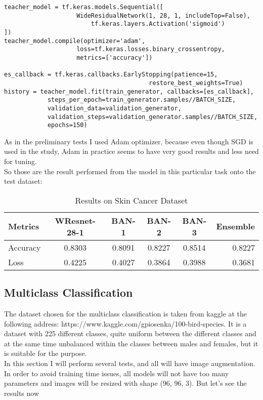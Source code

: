 \lstset{language=Python}
\lstset{frame=lines}
\lstset{basicstyle=\footnotesize}
\begin{lstlisting}
teacher_model = tf.keras.models.Sequential([
                 	WideResidualNetwork(1, 28, 1, includeTop=False),
                    	tf.keras.layers.Activation('sigmoid')
])
teacher_model.compile(optimizer='adam', 
					loss=tf.keras.losses.binary_crossentropy, 
					metrics=['accuracy'])

es_callback = tf.keras.callbacks.EarlyStopping(patience=15,
										restore_best_weights=True)
history = teacher_model.fit(train_generator, callbacks=[es_callback],
 			steps_per_epoch=train_generator.samples//BATCH_SIZE, 
 			validation_data=validation_generator, 
 			validation_steps=validation_generator.samples//BATCH_SIZE, 
 			epochs=150)
\end{lstlisting}
As in the preliminary tests I used Adam optimizer, because even though SGD is used in the study, Adam in practice seems to have very good results and less need for tuning.\\
So those are the result performed from the model in this particular task onto the test dataset:\\
\begin{table}[h!]
  \begin{center}
    \caption{Results on Skin Cancer Dataset}
    \begin{tabular}{l|c|c|c|c|r} 
      \textbf{Metrics} & \textbf{WResnet-28-1} & \textbf{BAN-1} & \textbf{BAN-2} & \textbf{BAN-3} & \textbf{Ensemble}\\ 
      \hline
      Accuracy & 0.8303 & 0.8091 & 0.8227 & 0.8514 & 0.8227\\
      Loss & 0.4225 & 0.4027 & 0.3864 & 0.3988 & 0.3681\\

    \end{tabular}
  \end{center}
\end{table}

\subsection{Multiclass Classification}
The dataset chosen for the multiclass classification is taken from kaggle at the following address: https://www.kaggle.com/gpiosenka/100-bird-species. It is a dataset with 225 different classes, quite uniform between the different classes and at the same time unbalanced within the classes between males and females, but it is suitable for the purpose.\\
In this section I will perform several tests, and all will have image augmentation.
In order to avoid training time issues, all models will not have too many parameters and images will be resized with shape (96, 96, 3). But let's see the results now
